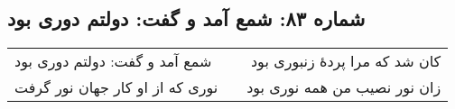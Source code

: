 \begin{center}
\section*{شماره ۸۳: شمع آمد و گفت: دولتم دوری بود}
\label{sec:083}
\begin{longtable}{l p{0.5cm} r}
شمع آمد و گفت: دولتم دوری بود
&&
کان شد که مرا پردهٔ زنبوری بود
\\
نوری که از او کار جهان نور گرفت
&&
زان نور نصیب من همه نوری بود
\\
\end{longtable}
\end{center}
